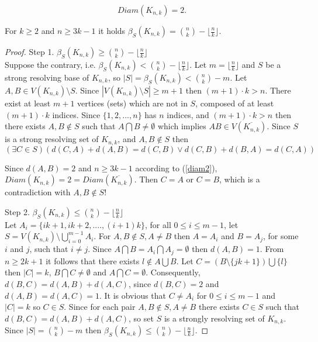 \documentclass[10pt,a4paper]{amsart}
\begin{document}
\begin{equation} \label{diam2} 
Diam(K_{n,k}) = 2.
\end{equation}

\begin{thm} \label{k3s} For $k \ge 2$ and $n \ge 3k-1$ it holds $\beta_S(K_{n,k}) = \binom{n}{k} - \lfloor \frac{n}{k} \rfloor$.
\end{thm}

\begin{proof}
Step 1. $\beta_S(K_{n,k}) \ge \binom{n}{k} - \lfloor \frac{n}{k} \rfloor$ \\
Suppose the contrary, i.e. $\beta_S(K_{n,k}) < \binom{n}{k} - \lfloor \frac{n}{k} \rfloor$.
Let $m = \lfloor \frac{n}{k} \rfloor$ and $S$ be a strong resolving base of $K_{n,k}$, so $|S| = \beta_S(K_{n,k}) < \binom{n}{k} - m$.
Let $A,B \in V(K_{n,k}) \setminus S$. Since $|V(K_{n,k}) \setminus S| \ge m+1$ then $(m+1) \cdot k > n$.
There exist at least $m+1$ vertices (sets) which are not in $S$, composed of at least $(m+1) \cdot k$ indices.
Since $\{1,2,...,n\}$ has $n$ indices, and $(m+1) \cdot k > n$ then there exists $A,B \notin S$ such
that $A \bigcap B \ne \emptyset$  which implies $AB \in V(\overline{K_{n,k}})$. Since $S$ is a
strong resolving set of $K_{n,k}$, and $A,B \notin S$ then 
$$(\exists C \in S) (d(C,A)+d(A,B)=d(C,B) \vee d(C,B)+d(B,A)=d(C,A))$$

Since $d(A,B)=2$ and $n \ge 3k-1$ according to (\ref{diam2}), $Diam(K_{n,k}) = 2 = Diam(\overline{K_{n,k}})$.
Then $C=A$ or $C=B$,
which is a contradiction with $A,B \notin S$!


Step 2. $\beta_S(K_{n,k}) \le \binom{n}{k} - \lfloor \frac{n}{k} \rfloor$ \\
Let $A_i = \{ik+1, ik+2, ...., (i+1)k\}$, for all $0 \le i \le m-1$,
let $S = V(K_{n,k}) \setminus \bigcup\limits_{i = 0}^{m - 1} {{A_i}}$.
For $A,B \notin S, A \ne B$ then $A=A_i$ and $B=A_j$, for some $i$ and $j$, such that $i \ne j$.
Since $A \bigcap B = A_i \bigcap A_j = \emptyset$ then $d(A,B) = 1$.
From $n \ge 2k+1$ it follows that there exists $l \notin A \bigcup B$.
Let $C = (B \setminus \{jk+1\}) \bigcup \{l\}$ then $|C|=k$, $B \bigcap C \ne \emptyset$
and $A \bigcap C = \emptyset$. Consequently, $d(B,C) = d(A,B) + d(A,C)$,
since $d(B,C)=2$ and $d(A,B) = d(A,C) = 1$.
It is obvious that $C \ne A_i$ for $0 \le i \le m-1$ and $|C|=k$ so
$C \in S$. Since for each pair $A,B \notin S, A \ne B$ there exists $C \in S$
such that $d(B,C) = d(A,B) + d(A,C)$, so set $S$ is a strongly resolving 
set of $K_{n,k}$. Since $|S|= \binom{n}{k} - m$ then $\beta_S(K_{n,k}) \le \binom{n}{k} - \lfloor \frac{n}{k} \rfloor$. 
\end{proof}
\end{document}
